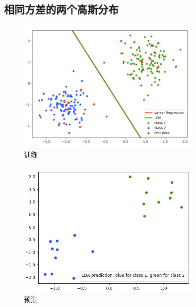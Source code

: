 \documentclass{article}
\begin{document}
\subsection*{相同方差的两个高斯分布} %
\label{sub:相同方差的两个高斯分布}
	\begin{figure}[H]
		\centering
		\includegraphics[width=0.8\textwidth]{Img/id_train.png}
		\caption{训练}
	\end{figure}
	\begin{figure}[H]
		\centering
		\includegraphics[width=0.8\textwidth]{Img/id_predict.png}
		\caption{预测}
	\end{figure}

\end{document}
